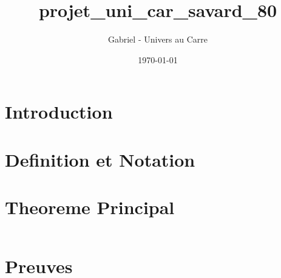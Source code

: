 \documentclass[12pt]{article}
\title{projet_uni_car_savard_80}
\author{Gabriel - Univers au Carre}
\date{\today}
\begin{document}
\maketitle


\section{Introduction}



\section{Definition et Notation}



\section{Theoreme Principal}


\begin{equation}
\end{equation}


\section{Preuves}


\end{document}
